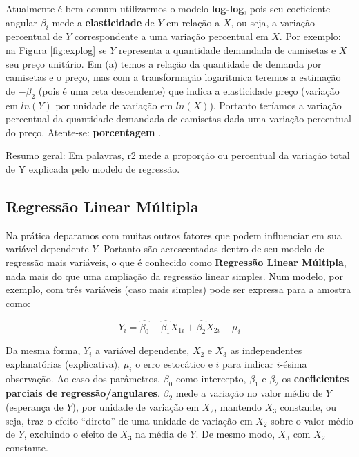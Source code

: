 \documentclass[
]{book}
\begin{document}
Atualmente é bem comum utilizarmos o modelo \textbf{log-log}, pois seu coeficiente angular \(\beta_i\) mede a \textbf{elasticidade} de \(Y\) em relação a \(X\), ou seja, a variação percentual de \(Y\) correspondente a uma variação percentual em \(X\). Por exemplo: na Figura \ref{fig:explog} se \(Y\) representa a quantidade demandada de camisetas e \(X\) seu preço unitário. Em (a) temos a relação da quantidade de demanda por camisetas e o preço, mas com a transformação logaritmica teremos a estimação de \(-\beta_2\) (pois é uma reta descendente) que indica a elasticidade preço (variação em \(ln(Y)\) por unidade de variação em \(ln(X)\)). Portanto teríamos a variação percentual da quantidade demandada de camisetas dada uma variação percentual do preço. Atente-se: \textbf{porcentagem} \citep{gujarati2011econometria}.

Resumo geral: Em palavras, r2 mede a proporção ou percentual da variação total de Y explicada pelo modelo de regressão.

\hypertarget{regmult}{%
\subsection{Regressão Linear Múltipla}\label{regmult}}

Na prática deparamos com muitas outros fatores que podem influenciar em sua variável dependente \(Y\). Portanto são acrescentadas dentro de seu modelo de regressão mais variáveis, o que é conhecido como \textbf{Regressão Linear Múltipla}, nada mais do que uma ampliação da regressão linear simples. Num modelo, por exemplo, com três variáveis (caso mais simples) pode ser expressa para a amostra como:

\begin{equation}
    Y_i=\hat{\beta_0}+\hat{\beta_{1}}X_{1i}+\hat{\beta_{2}}X_{2i}+\mu_i
    \label{eq:regmult}
\end{equation}

Da mesma forma, \(Y_i\) a variável dependente, \(X_{2}\) e \(X_{3}\) as independentes explanatórias (explicativa), \(\mu_i\) o erro estocático e \(i\) para indicar \(i\)-ésima observação. Ao caso dos parâmetros, \(\beta_0\) como intercepto, \(\beta_1\) e \(\beta_2\) os \textbf{coeficientes parciais de regressão/angulares}. \(\beta_2\) mede a variação no valor médio de \(Y\) (esperança de \(Y\)), por unidade de variação em \(X_2\), mantendo \(X_3\) constante, ou seja, traz o efeito ``direto'' de uma unidade de variação em \(X_2\) sobre o valor médio de \(Y\), excluindo o efeito de \(X_3\) na média de \(Y\). De mesmo modo, \(X_3\) com \(X_2\) constante.
\end{document}
